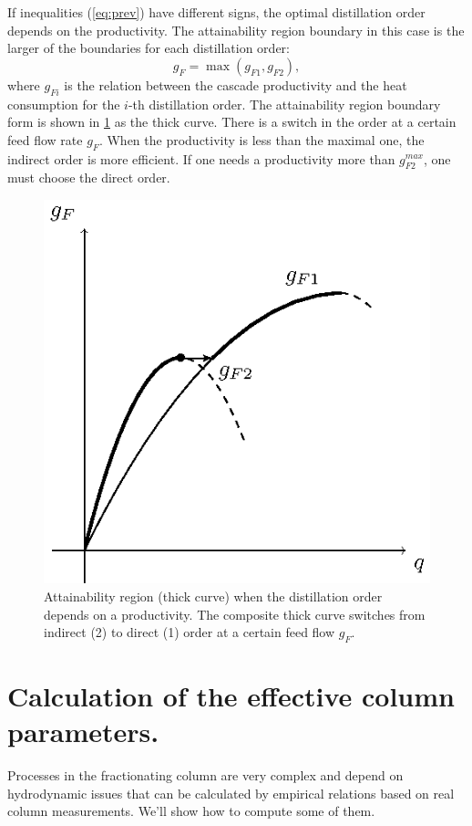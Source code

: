 \documentclass[12pt]{article}
\begin{document}
If inequalities (\ref{eq:prev}) have different signs, the optimal distillation order depends on the productivity. The attainability region boundary in this case is the larger of the boundaries for each distillation order:
\begin{equation}
g_F = \max(g_{F1}, g_{F2}),
\end{equation}
where $g_{Fi}$ is the relation between the cascade productivity and the heat consumption for the $i$-th distillation order. The attainability region boundary form is shown in \ref{fig:pic2} as the thick curve. There is a switch in the order at a certain feed flow rate $g_F$. When the productivity is less than the maximal one, the indirect order is more efficient. If one needs a productivity more than $g_{F2}^{max}$, one must choose the direct order.
\begin{figure}[tbh]
\centering
\includegraphics{pic2}
\caption{Attainability region (thick curve) when the distillation order depends on a productivity. The composite thick curve switches from indirect (2) to direct (1) order at a certain feed flow $g_F$.}
\label{fig:pic2}
\end{figure}


\section {Calculation of the effective column parameters.}
Processes in the fractionating column are very complex and depend on hydrodynamic issues that can be calculated by empirical relations based on real column measurements. We'll show how to compute some of them.
\end{document}
